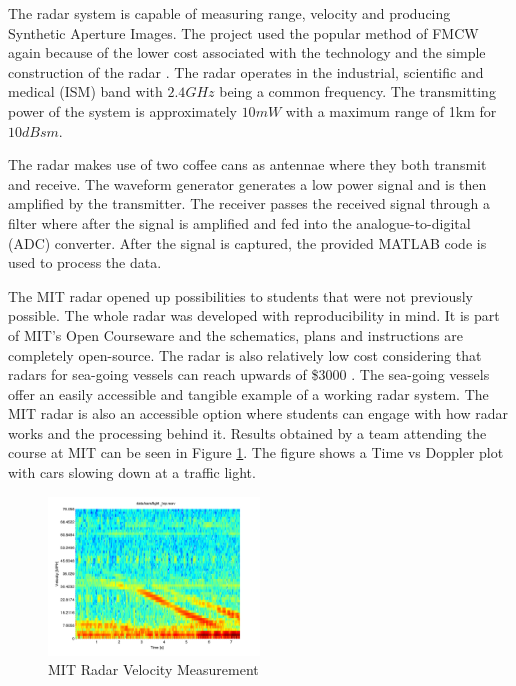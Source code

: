 The radar system is capable of measuring range, velocity and producing Synthetic Aperture Images. The project used the popular method of FMCW again because of the lower cost associated with the technology and the simple construction of the radar \cite{charvat_mit_2012}. The radar operates in the industrial, scientific and medical (ISM) band with $2.4 GHz$ being a common frequency. The transmitting power of the system is approximately $10 mW$ with a maximum range of 1km for $10 dBsm$. 

The radar makes use of two coffee cans as antennae where they both transmit and receive. The waveform generator generates a low power signal and is then amplified by the transmitter. The receiver passes the received signal through a filter where after the signal is amplified and fed into the analogue-to-digital (ADC) converter. After the signal is captured, the provided MATLAB code is used to process the data. 

The MIT radar opened up possibilities to students that were not previously possible. The whole radar was developed with reproducibility in mind. It is part of MIT's Open Courseware and the schematics, plans and instructions are completely open-source. The radar is also relatively low cost considering that radars for sea-going vessels can reach upwards of \$3000 \cite{noauthor_raymarine_nodate}. The sea-going vessels offer an easily accessible and tangible example of a working radar system. The MIT radar is also an accessible option where students can engage with how radar works and the processing behind it. Results obtained by a team attending the course at MIT can be seen in Figure \ref{MITResults}. The figure shows a Time vs Doppler plot with cars slowing down at a traffic light.
\begin{figure}[h!]
    \centering
    \includegraphics[width = 0.5\textwidth]{images/stop.pdf}
    \caption{MIT Radar Velocity Measurement \cite{charvat_mit_2012}}\label{MITResults}
\end{figure}

